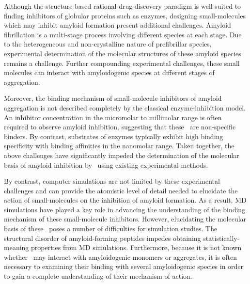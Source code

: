 
Although the structure-based rational drug discovery paradigm is well-suited to finding inhibitors of globular proteins such as enzymes, designing small-molecules which may inhibit amyloid formation present additional challenges. Amyloid fibrillation is a multi-stage process involving different species at each stage.  Due to the heterogeneous and non-crystalline nature of prefibrillar species, experimental determination of the molecular structures of these amyloid species remains a challenge.  Further compounding experimental challenges, these small molecules can interact with amyloidogenic species at different stages of aggregation. 

Moreover, the binding mechanism of small-molecule inhibitors of amyloid aggregation is not described completely by the classical enzyme-inhibition model.   An inhibitor concentration in the micromolar to millimolar range is often required to observe amyloid inhibition, suggesting that these \smis\ are non-specific binders. By contrast, substrates of enzymes typically exhibit high binding specificity with binding affinities in the nanomolar range.  Taken together, the above challenges have significantly impeded the determination of the molecular basis of amyloid inhibition by \smis\ using existing experimental methods.  

By contrast, computer simulations are not limited by these experimental challenges and can provide the atomistic level of detail needed to elucidate the action of small-molecules on the inhibition of amyloid formation.
As a result, MD simulations have played a key role in advancing the understanding of the binding mechanism of these small-molecule inhibitors. However, elucidating the molecular basis of these \smis\ poses a number of difficulties for simulation studies. The structural disorder of amyloid-forming peptides impedes obtaining statistically-meaning properties from MD simulations.  Furthermore, because it is not known whether \smis\ may interact with amyloidogenic monomers or aggregates, it is often necessary to examining their binding with several amyloidogenic species in order to gain a complete understanding of their mechanism of action.

